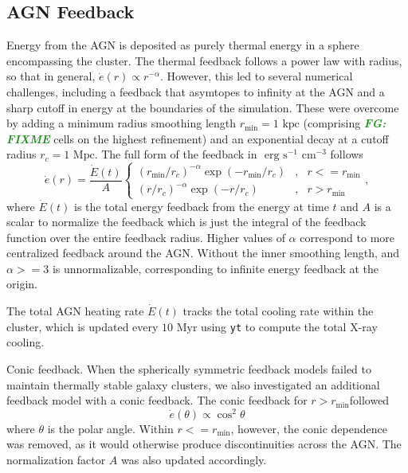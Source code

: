 \documentclass[iop,apjl, twocolappendix]{emulateapj}   %
\def\FG#1{{\textcolor{ForestGreen}{\textbf{\textit{ FG: #1}}}}}
\begin{document}
\subsection{AGN Feedback}
\textbullet Energy from the AGN is deposited as purely thermal energy in a
sphere encompassing the cluster.  The thermal feedback follows a power law with
radius, so that in general, $\dot{e} (r) \propto r^{-\alpha}$. However, this
led to several numerical challenges, including a feedback that asymtopes to
infinity at the AGN and a sharp cutoff in energy at the boundaries of the
simulation. These were overcome by adding a minimum radius smoothing length
$r_{\text{min}} = 1 \text{ kpc}$ (comprising \FG{FIXME} cells on the highest
refinement) and an exponential decay at a cutoff radius $r_c = 1 \text{ Mpc}.$
The full form of the feedback in $\text{ erg} \text{ s}^{-1} \text{ cm}^{-3}$ follows
\begin{equation}
  \dot{e}(r) = \frac{\dot{E}(t)}{A}
  \left\{\begin{matrix}
    \left( r_{\text{min}}/r_c \right )^{-\alpha} \exp {\left ( -r_{\text{min}}/r_c \right )} & , &r <= r_{\text{min}} \\
    \left( r /r_c \right )^{-\alpha} \exp { \left ( -r/r_c \right )}                         & , &r >  r_{\text{min}}
  \end{matrix}\right.,
\end{equation}
where $\dot{E}(t)$ is the total energy feedback from the energy at time $t$ and
$A$ is a scalar to normalize the feedback which is just the integral of the
feedback function over the entire feedback radius. Higher values of $\alpha$
correspond to more centralized feedback around the AGN. Without the inner
smoothing length, and $\alpha >= 3$ is unnormalizable, corresponding to
infinite energy feedback at the origin.

The total AGN heating rate $\dot E(t)$ tracks the total cooling rate within the
cluster, which is updated every $10 \text{ Myr}$ using \texttt{yt} to compute the total
X-ray cooling.

\textbullet Conic feedback. When the spherically symmetric feedback models
failed to maintain thermally stable galaxy clusters, we also investigated an
additional feedback model with a conic feedback. The conic feedback for $r >
r_{\text{min}}$followed
\begin{equation}
	\dot{e}(\theta) \propto \cos^2 \theta 
\end{equation}
where $\theta$ is the polar angle. Within $r <= r_{\text{min}}$, however, the
conic dependence was removed, as it would otherwise produce discontinuities
across the AGN. The normalization factor $A$ was also updated accordingly.
\end{document}
